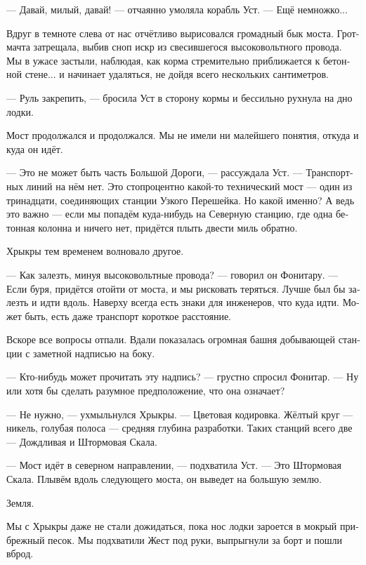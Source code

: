\documentclass[a4paper,10pt,fleqn]{book}\usepackage{polyglossia}\setdefaultlanguage[babelshorthands=true]{russian}\setotherlanguage{english}\defaultfontfeatures{Ligatures=TeX,Mapping=tex-text}
\newcommand{\asterism}{\vspace{1em}{\centering\Large\bfseries$\ast~\ast~\ast$\par}\vspace{1em}}
\begin{document}
--- Давай, милый, давай! --- отчаянно умоляла корабль Уст.
--- Ещё немножко...

Вдруг в темноте слева от нас отчётливо вырисовался громадный бык моста.
Грот-мачта затрещала, выбив сноп искр из свесившегося высоковольтного провода.
Мы в ужасе застыли, наблюдая, как корма стремительно приближается к бетонной стене... и начинает удаляться, не дойдя всего нескольких сантиметров.

--- Руль закрепить, --- бросила Уст в сторону кормы и бессильно рухнула на дно лодки.

\asterism

Мост продолжался и продолжался.
Мы не имели ни малейшего понятия, откуда и куда он идёт.

--- Это не может быть часть Большой Дороги, --- рассуждала Уст.
--- Транспортных линий на нём нет.
Это стопроцентно какой-то технический мост --- один из тринадцати, соединяющих станции Узкого Перешейка.
Но какой именно?
А ведь это важно --- если мы попадём куда-нибудь на Северную станцию, где одна бетонная колонна и ничего нет, придётся плыть двести миль обратно.

Хрыкры тем временем волновало другое.

--- Как залезть, минуя высоковольтные провода? --- говорил он Фонитару.
--- Если буря, придётся отойти от моста, и мы рисковать теряться.
Лучше был бы залезть и идти вдоль.
Наверху всегда есть знаки для инженеров, что куда идти.
Может быть, есть даже транспорт короткое расстояние.

Вскоре все вопросы отпали.
Вдали показалась огромная башня добывающей станции с заметной надписью на боку.

--- Кто-нибудь может прочитать эту надпись? --- грустно спросил Фонитар.
--- Ну или хотя бы сделать разумное предположение, что она означает?

--- Не нужно, --- ухмыльнулся Хрыкры.
--- Цветовая кодировка.
Жёлтый круг --- никель, голубая полоса --- средняя глубина разработки.
Таких станций всего две --- Дождливая и Штормовая Скала.

--- Мост идёт в северном направлении, --- подхватила Уст.
--- Это Штормовая Скала.
Плывём вдоль следующего моста, он выведет на большую землю.

\asterism

Земля.

Мы с Хрыкры даже не стали дожидаться, пока нос лодки зароется в мокрый прибрежный песок.
Мы подхватили Жест под руки, выпрыгнули за борт и пошли вброд.
\end{document}
